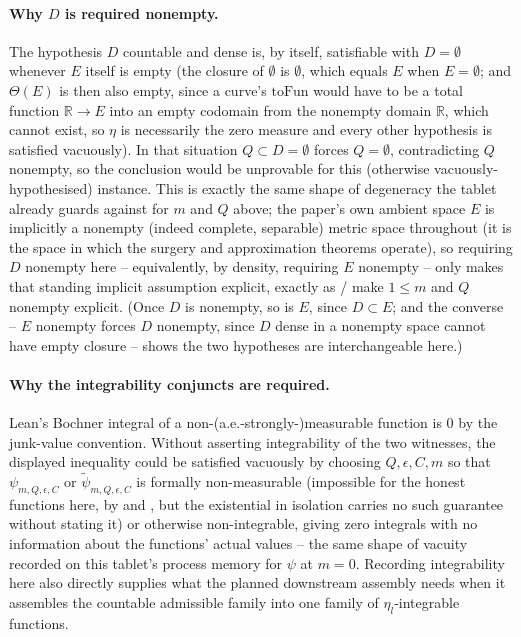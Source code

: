 \begin{lemma}
  \paragraph{Why $D$ is required nonempty.} The hypothesis $D$ countable and dense is, by itself,
  satisfiable with $D=\emptyset$ whenever $E$ itself is empty (the closure of $\emptyset$ is
  $\emptyset$, which equals $E$ when $E=\emptyset$; and $\Theta(E)$ is then also empty, since a
  curve's $\mathrm{toFun}$ would have to be a total function $\mathbb{R}\to E$ into an empty
  codomain from the nonempty domain $\mathbb{R}$, which cannot exist, so $\eta$ is necessarily the
  zero measure and every other hypothesis is satisfied vacuously). In that situation
  $Q \subset D = \emptyset$ forces $Q=\emptyset$, contradicting $Q$ nonempty, so the conclusion
  would be unprovable for this (otherwise vacuously-hypothesised) instance. This is exactly the
  same shape of degeneracy the tablet already guards against for $m$ and $Q$ above; the paper's own
  ambient space $E$ is implicitly a nonempty (indeed complete, separable) metric space throughout
  (it is the space in which the surgery and approximation theorems operate), so requiring $D$
  nonempty here -- equivalently, by density, requiring $E$ nonempty -- only makes that standing
  implicit assumption explicit, exactly as / make $1\le m$
  and $Q$ nonempty explicit. (Once $D$ is nonempty, so is $E$, since $D\subset E$; and the converse
  -- $E$ nonempty forces $D$ nonempty, since $D$ dense in a nonempty space cannot have empty
  closure -- shows the two hypotheses are interchangeable here.)

  \paragraph{Why the integrability conjuncts are required.} Lean's Bochner integral of a
  non-(a.e.-strongly-)measurable function is $0$ by the junk-value convention. Without asserting
  integrability of the two witnesses, the displayed inequality could be satisfied vacuously by
  choosing $Q,\epsilon,C,m$ so that $\psi_{m,Q,\epsilon,C}$ or $\tilde\psi_{m,Q,\epsilon,C}$ is
  formally non-measurable (impossible for the honest functions here, by  and
  , but the existential in isolation carries no such guarantee without
  stating it) or otherwise non-integrable, giving zero integrals with no information about the
  functions' actual values -- the same shape of vacuity recorded on this tablet's process memory
  for $\psi$ at $m=0$. Recording integrability here also directly supplies what the planned
  downstream assembly needs when it assembles the countable admissible family into one family of
  $\eta_l$-integrable functions.
\end{lemma}
